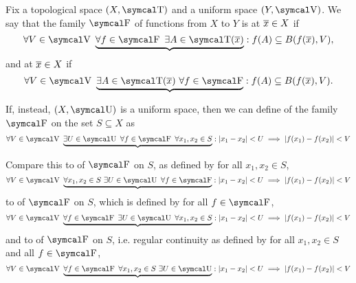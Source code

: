 \begin{definition}\label{def:function_set_continuity}\cite[285]{Bouziad2004}
  Fix a topological space \( (X, \CT) \) and a uniform space \( (Y, \CV) \). We say that the family \( \CF \) of functions from \( X \) to \( Y \) is  at \( \overline{x} \in X \) if
  \begin{equation}\label{def:function_set_continuity/functionwise}
    \forall V \in \CV \ \underbrace{\forall f \in \CF \ \exists A \in \CT(\Ol{x})} : f(A) \subseteq B(f(\Ol{x}), V),
  \end{equation}
  and  at \( \overline{x} \in X \) if
  \begin{equation}\label{def:function_set_continuity/equicontinuous}
    \forall V \in \CV \ \underbrace{\exists A \in \CT(\Ol{x}) \ \forall f \in \CF} : f(A) \subseteq B(f(\Ol{x}), V).
  \end{equation}

  If, instead, \( (X, \CU) \) is a uniform space, then we can define  of the family \( \CF \) on the set \( S \subseteq X \) as
  \begin{equation}\label{def:function_set_continuity/uniform_equicontinuous}
    \forall V \in \CV \ \underbrace{\exists U \in \CU \ \forall f \in \CF \ \forall x_1, x_2 \in S} : \Abs{x_1 - x_2} < U \implies \Abs{f(x_1) - f(x_2)} < V
  \end{equation}

  Compare this to  of \( \CF \) on \( S \), as defined by  for all \( x_1, x_2 \in S \),
  \begin{equation}\label{def:function_set_continuity/pointwise_equicontinuous}
    \forall V \in \CV \ \underbrace{\forall x_1, x_2 \in S \ \exists U \in \CU \ \forall f \in \CF} : \Abs{x_1 - x_2} < U \implies \Abs{f(x_1) - f(x_2)} < V
  \end{equation}
  to  of \( \CF \) on \( S \), which is defined by  for all \( f \in \CF \),
  \begin{equation}\label{def:function_set_continuity/uniform_functionwise}
    \forall V \in \CV \ \underbrace{\forall f \in \CF \ \exists U \in \CU \ \forall x_1, x_2 \in S} : \Abs{x_1 - x_2} < U \implies \Abs{f(x_1) - f(x_2)} < V
  \end{equation}
  and to  of \( \CF \) on \( S \), i.e. regular continuity as defined by  for all \( x_1, x_2 \in S \) and all \( f \in \CF \),
  \begin{equation}\label{def:function_set_continuity/functionwise_pointwise}
    \forall V \in \CV \ \underbrace{\forall f \in \CF \ \forall x_1, x_2 \in S \ \exists U \in \CU} : \Abs{x_1 - x_2} < U \implies \Abs{f(x_1) - f(x_2)} < V
  \end{equation}
\end{definition}

